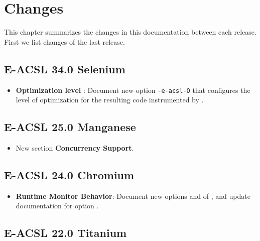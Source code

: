 \chapter{Changes}\label{chap:changes}

This chapter summarizes the changes in this documentation between each \eacsl
release. First we list changes of the last release.



\section*{E-ACSL 34.0 Selenium}

\begin{itemize}
\item \textbf{Optimization level} : Document new option
\texttt{-e-acsl-O} that configures the level of optimization for the resulting
code instrumented by \eacsl.
\end{itemize}


\section*{E-ACSL 25.0 Manganese}

\begin{itemize}
\item New section \textbf{Concurrency Support}.
\end{itemize}

\section*{E-ACSL 24.0 Chromium}

\begin{itemize}
\item \textbf{Runtime Monitor Behavior}: Document new options
   and  of
  \eacslgcc, and update documentation for option .
\end{itemize}

\section*{E-ACSL 22.0 Titanium}

